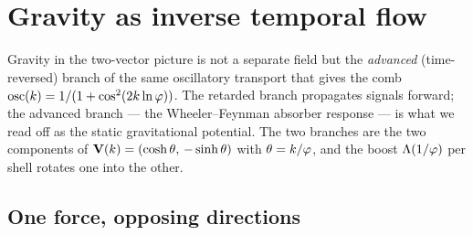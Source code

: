 \section{Gravity as inverse temporal flow}
\label{sec:gravity}

Gravity in the two-vector picture is not a separate field but the \emph{advanced} (time-reversed) branch of the same oscillatory transport that gives the comb $\operatorname{osc}(k)=1/(1+\cos^2(2k\ln\varphi))$. The retarded branch propagates signals forward; the advanced branch — the Wheeler--Feynman absorber response — is what we read off as the static gravitational potential. The two branches are the two components of $\mathbf{V}(k)=(\cosh\theta,\,-\sinh\theta)$ with $\theta=k/\varphi$, and the boost $\Lambda(1/\varphi)$ per shell rotates one into the other.

\subsection{One force, opposing directions}

